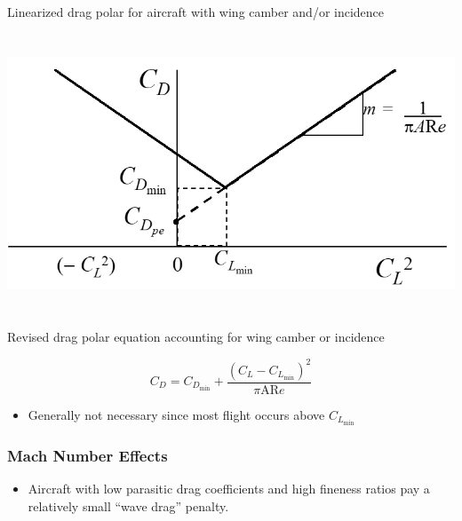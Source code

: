 \documentclass[
]{book}
\providecommand{\tightlist}{%
  \setlength{\itemsep}{0pt}\setlength{\parskip}{0pt}}
\begin{document}
Linearized drag polar for aircraft with wing camber and/or incidence

\includegraphics[width=6.325in,height=3.274in]{media/05/image81.png}

Revised drag polar equation accounting for wing camber or incidence

\[C_D = C_{D_{\mathrm{min}}} + \frac{\left(C_L - C_{L_{\mathrm{min}}} \right)^2}{\pi \mathrm{AR} e} \]

\begin{itemize}
\tightlist
\item
  Generally not necessary since most flight occurs above \(C_{L_{\mathrm{min}}}\)
\end{itemize}

\hypertarget{mach-number-effects}{%
\subsubsection*{Mach Number Effects}\label{mach-number-effects}}

\begin{itemize}
\tightlist
\item
  Aircraft with low parasitic drag coefficients and high fineness ratios pay a relatively small ``wave drag'' penalty.
\end{itemize}
\end{document}
